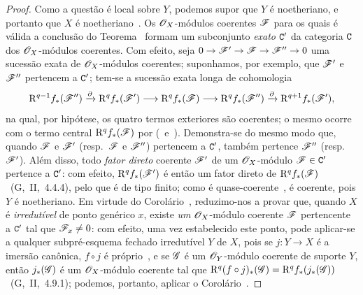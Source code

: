 \begin{proof}
Como a questão é local sobre $Y$, podemos supor que $Y$ é noetheriano, e portanto que $X$ é noetheriano~.
Os $\mathscr{O}_X$-módulos coerentes $\mathscr{F}$ para os quais é válida a conclusão do Teorema~ formam um subconjunto \emph{exato} $\mathtt{C}'$ da categoria $\mathtt{C}$ dos $\mathscr{O}_X$-módulos coerentes.
Com efeito, seja $0\to\sh{F}'\to\sh{F}\to\sh{F}''\to 0$ uma sucessão exata de $\mathscr{O}_X$-módulos coerentes; suponhamos, por exemplo, que $\mathscr{F}'$ e $\mathscr{F}''$ pertencem a $\mathtt{C}'$; tem-se a sucessão exata longa de cohomologia
\[
  \RR^{q-1}f_*(\sh{F}'')\xrightarrow{\partial}\RR^q f_*(\sh{F}')\to\RR^q f_*(\sh{F})\to\RR^q f_*(\sh{F}'')\xrightarrow{\partial}\RR^{q+1}f_*(\sh{F}'),
\]
na qual, por hipótese, os quatro termos exteriores são coerentes; o mesmo ocorre com o termo central $\mathrm{R}^q f_*(\mathscr{F})$ por (~e~).
Demonstra-se do mesmo modo que, quando $\mathscr{F}$ e $\mathscr{F}'$ (resp.~$\mathscr{F}$ e $\mathscr{F}''$) pertencem a $\mathtt{C}'$, também pertence $\mathscr{F}''$ (resp.~$\mathscr{F}'$).
Além disso, todo \emph{fator direto} coerente $\mathscr{F}'$ de um $\mathscr{O}_X$-módulo $\mathscr{F}\in\mathtt{C}'$ pertence a $\mathtt{C}'$: com efeito, $\mathrm{R}^q f_*(\mathscr{F}')$ é então um fator direto de $\mathrm{R}^q f_*(\mathscr{F})$~(G,~II,~4.4.4), pelo que é de tipo finito; como é quase-coerente~, é coerente, pois $Y$ é noetheriano.
Em virtude do Corolário~, reduzimo-nos a provar que, quando $X$ é \emph{irredutível} de ponto genérico $x$, existe \emph{um} $\mathscr{O}_X$-módulo coerente $\mathscr{F}$ pertencente a $\mathtt{C}'$ tal que $\mathscr{F}_x\neq 0$: com efeito, uma vez estabelecido este ponto, pode aplicar-se a qualquer subpré-esquema fechado irredutível $Y$ de $X$, pois se $j:Y\to X$ é a imersão canônica, $f\circ j$ é próprio~, e se $\mathscr{G}$ é um $\mathscr{O}_Y$-módulo coerente de suporte $Y$, então $j_*(\mathscr{G})$ é um $\mathscr{O}_X$-módulo coerente tal que $\mathrm{R}^q(f\circ j)_*(\mathscr{G})=\mathrm{R}^q f_*(j_*(\mathscr{G}))$~(G,~II,~4.9.1); podemos, portanto, aplicar o Corolário~.


\end{proof}

